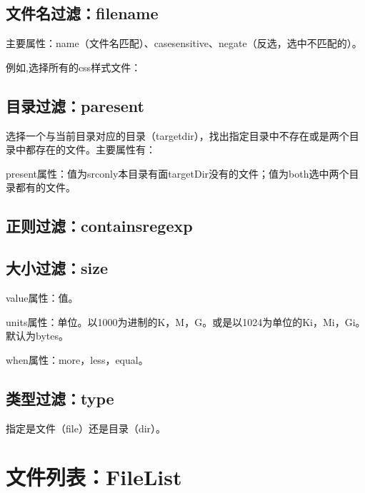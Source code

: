 	\subsection{文件名过滤：filename}

		主要属性：name（文件名匹配）、casesensitive、negate（反选，选中不匹配的）。

		例如,选择所有的css样式文件：

		
		
	\subsection{目录过滤：paresent}

		选择一个与当前目录对应的目录（targetdir），找出指定目录中不存在或是两个目录中都存在的文件。主要属性有：

		present属性：值为srconly本目录有面targetDir没有的文件；值为both选中两个目录都有的文件。

		

	\subsection{正则过滤：containsregexp}

		

	\subsection{大小过滤：size}

		value属性：值。

		units属性：单位。以1000为进制的K，M，G。或是以1024为单位的Ki，Mi，Gi。默认为bytes。

		when属性：more，less，equal。

		

	\subsection{类型过滤：type}
		
		指定是文件（file）还是目录（dir）。

		

\section{文件列表：FileList}

